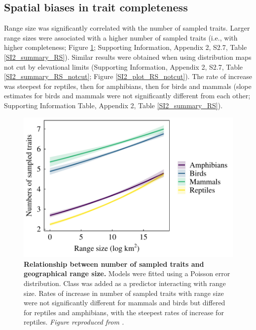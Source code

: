 \subsection{Spatial biases in trait completeness}
Range size was significantly correlated with the number of sampled traits. Larger range sizes were associated with a higher number of sampled traits (i.e., with higher completeness; Figure \ref{1_Range_size}; Supporting Information, Appendix 2, S2.7, Table \ref{SI2_summary_RS}). Similar results were obtained when using distribution maps not cut by elevational limits (Supporting Information, Appendix 2, S2.7, Table \ref{SI2_summary_RS_notcut}; Figure \ref{SI2_plot_RS_notcut}). The rate of increase was steepest for reptiles, then for amphibians, then for birds and mammals (slope estimates for birds and mammals were not significantly different from each other; Supporting Information Table, Appendix 2, Table \ref{SI2_summary_RS}).

\begin{figure}[h!]
\centering
\includegraphics[scale=0.7]{figures/Chapter1/Figure_4}
\caption[Relationship between number of sampled traits and geographical range size]{\textbf{Relationship between number of sampled traits and geographical range size.} Models were fitted using a Poisson error distribution. Class was added as a predictor interacting with range size. Rates of increase in number of sampled traits with range size were not significantly different for mammals and birds but differed for reptiles and amphibians, with the steepest rates of increase for reptiles. \textit{Figure reproduced from \citet{Etard2020}.}}
\label{1_Range_size}
\end{figure}

